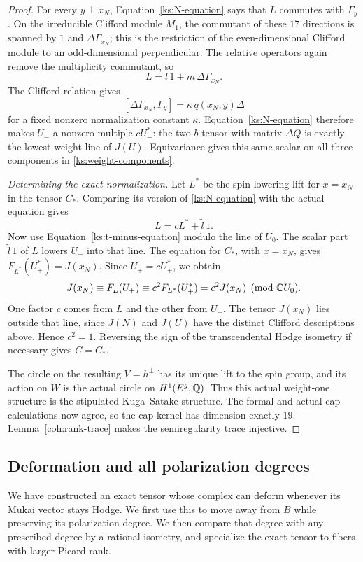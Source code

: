 \begin{proof}
For every $y\perp x_N$, Equation~\eqref{ks:N-equation}
says that $L$ commutes with $\Gamma_y$.  On the irreducible
Clifford module $M_1$, the commutant of these $17$
directions is spanned by $1$ and $\Delta\Gamma_{x_N}$;
this is the restriction of the even-dimensional Clifford
module to an odd-dimensional perpendicular.  The relative
operators again remove the multiplicity commutant, so
\[
 L=l\,1+m\,\Delta\Gamma_{x_N}.
\]
The Clifford relation gives
\[
 [\Delta\Gamma_{x_N},\Gamma_y]
   =\kappa\,q(x_N,y)\Delta
\]
for a fixed nonzero normalization constant $\kappa$.
Equation~\eqref{ks:N-equation} therefore makes $U_-$ a
nonzero multiple $cU_-^*$: the two-$b$ tensor with matrix
$\Delta Q$ is exactly the lowest-weight line of $J(U)$.
Equivariance gives this same scalar on all three
components in \eqref{ks:weight-components}.

\emph{Determining the exact normalization.}
Let $L^*$ be the spin lowering lift for
$x=x_N$ in the tensor $C_*$.  Comparing its version of
\eqref{ks:N-equation} with the actual equation gives
\[
 L=cL^*+\widetilde l\,1.
\]
Now use Equation~\eqref{ks:t-minus-equation} modulo the line
of $U_0$.  The scalar part $\widetilde l\,1$ of $L$
lowers $U_+$ into that line.  The equation for $C_*$,
with $x=x_N$, gives $F_{L^*}(U_+^*)=J(x_N)$.
Since $U_+=cU_+^*$, we obtain
\[
 J(x_N)\equiv F_L(U_+)
   \equiv c^2 F_{L^*}(U_+^*)=c^2J(x_N)
       \pmod{\mathbb C U_0}.
\]
One factor $c$ comes from $L$ and the other from $U_+$.
The tensor
$J(x_N)$ lies outside that line, since $J(N)$ and $J(U)$
have the distinct Clifford descriptions above.  Hence
$c^2=1$.  Reversing the sign of the transcendental Hodge
isometry if necessary gives $C=C_*$.

The circle on the resulting $V=h^\perp$ has its unique
lift to the spin group, and its action on $W$ is the
actual circle on $H^1(E^g,\mathbb Q)$.  Thus this actual
weight-one structure is the stipulated Kuga--Satake
structure.  The formal and actual cap calculations now
agree, so the cap kernel has dimension exactly $19$.
Lemma~\ref{coh:rank-trace} makes the
semiregularity trace injective.
\end{proof}

\subsection{Deformation and all polarization degrees}
\label{ks:deformation}

We have constructed an exact tensor whose complex can deform
whenever its Mukai vector stays Hodge.  We first use this to
move away from $B$ while preserving its polarization degree.
We then compare that degree with any prescribed degree by a
rational isometry, and specialize the exact tensor to fibers
with larger Picard rank.

